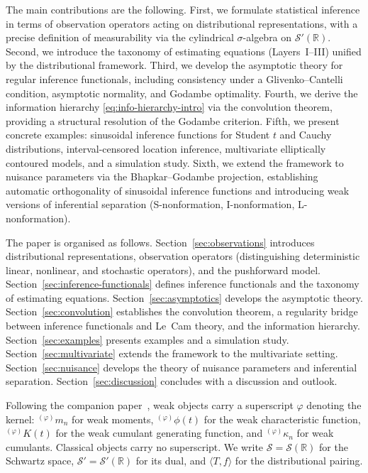 \documentclass[11pt,a4paper]{article}
\newcommand{\R}{\mathbb{R}}
\begin{document}
The main contributions are the following.  First, we formulate
statistical inference in terms of observation operators acting on
distributional representations, with a precise definition of measurability
via the cylindrical $\sigma$-algebra on $\mathcal S'(\R)$.  Second, we
introduce the taxonomy of estimating equations
(Layers~I--III) unified by the distributional framework.  Third, we
develop the asymptotic theory for regular inference functionals, including
consistency under a Glivenko--Cantelli condition, asymptotic normality,
and Godambe optimality.  Fourth, we derive the information hierarchy
\eqref{eq:info-hierarchy-intro} via the convolution theorem, providing a
structural resolution of the Godambe criterion.  Fifth, we present
concrete examples: sinusoidal inference functions for Student $t$ and
Cauchy distributions, interval-censored location inference, multivariate
elliptically contoured models, and a simulation study.  Sixth, we extend
the framework to nuisance parameters via the Bhapkar--Godambe projection,
establishing automatic orthogonality of sinusoidal inference functions and
introducing weak versions of inferential separation
(S-nonformation, I-nonformation, L-nonformation).

The paper is organised as follows.
Section~\ref{sec:observations} introduces distributional representations,
observation operators (distinguishing deterministic linear, nonlinear, and
stochastic operators), and the pushforward model.
Section~\ref{sec:inference-functionals} defines inference functionals
and the taxonomy of estimating equations.
Section~\ref{sec:asymptotics} develops the asymptotic theory.
Section~\ref{sec:convolution} establishes the convolution theorem,
a regularity bridge between inference functionals and Le~Cam theory,
and the information hierarchy.
Section~\ref{sec:examples} presents examples and a simulation study.
Section~\ref{sec:multivariate} extends the framework to the multivariate
setting.
Section~\ref{sec:nuisance} develops the theory of nuisance parameters
and inferential separation.
Section~\ref{sec:discussion} concludes with a discussion and outlook.

Following the companion paper~\cite{LabouriauA1}, weak objects carry a
superscript $\varphi$ denoting the kernel:
${}^{(\varphi)}m_n$ for weak moments,
${}^{(\varphi)}\phi(t)$ for the weak characteristic function,
${}^{(\varphi)}K(t)$ for the weak cumulant generating function, and
${}^{(\varphi)}\kappa_n$ for weak cumulants.  Classical objects carry no
superscript.  We write $\mathcal S = \mathcal S(\R)$ for the Schwartz space,
$\mathcal S' = \mathcal S'(\R)$ for its dual, and
$\langle T, f\rangle$ for the distributional pairing.
\end{document}
